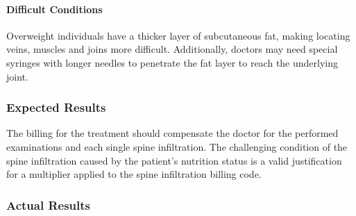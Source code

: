 \paragraph{Difficult Conditions}
Overweight individuals have a thicker layer of subcutaneous fat, making locating veins, muscles and joins more difficult.
Additionally, doctors may need special syringes with longer needles to penetrate the fat layer to reach the underlying joint.


\subsubsection{Expected Results}
The billing for the treatment should compensate the doctor for the performed examinations and each single spine infiltration.
The challenging condition of the spine infiltration caused by the patient's nutrition status is a valid justification for a multiplier applied to the spine infiltration billing code.


\subsubsection{Actual Results}





